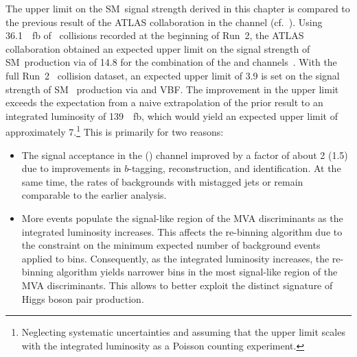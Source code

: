 The upper limit on the SM~\HH signal strength derived in this chapter is
compared to the previous result of the ATLAS collaboration in the \bbtautau
channel (cf.~). Using \SI{36.1}{\per\femto\barn}
of \pp~collisions recorded at the beginning of Run~2, the ATLAS collaboration
obtained an expected upper limit on the signal strength of SM~\HH production via
\ggF of 14.8 for the combination of the \lephad and \hadhad
channels~\cite{HIGG-2016-16-witherratum}. With the full Run~2 \pp~collision
dataset, an expected upper limit of 3.9 is set on the signal strength of SM~\HH
production via \ggF and VBF. The improvement in the upper limit exceeds the
expectation from a naive extrapolation of the prior result to an integrated
luminosity of \SI{139}{\per\femto\barn}, which would yield an expected upper
limit of approximately 7.\footnote{Neglecting systematic uncertainties and
  assuming that the upper limit scales with the integrated luminosity as a
  Poisson counting experiment.} This is primarily for two reasons:
\begin{itemize}

\item The signal acceptance in the \hadhad (\lephad) channel improved by a
  factor of about 2 (1.5) due to improvements in $b$-tagging, \tauhadvis
  reconstruction, and \tauhadvis identification. At the same time, the rates of
  backgrounds with mistagged jets or \faketauhadvis remain comparable to the
  earlier analysis.

\item More events populate the signal-like region of the MVA discriminants as
  the integrated luminosity increases. This affects the re-binning algorithm due
  to the constraint on the minimum expected number of background events applied
  to bins. Consequently, as the integrated luminosity increases, the re-binning
  algorithm yields narrower bins in the most signal-like region of the MVA
  discriminants. This allows to better exploit the distinct signature of Higgs
  boson pair production.

\end{itemize}

